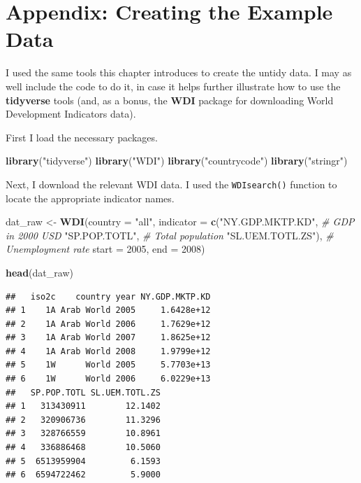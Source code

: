 \documentclass[12pt,oneside,openany]{tufte-book}
\newenvironment{Shaded}{}{}
\newcommand{\KeywordTok}[1]{\textcolor[rgb]{0.00,0.44,0.13}{\textbf{{#1}}}}
\newcommand{\DataTypeTok}[1]{\textcolor[rgb]{0.56,0.13,0.00}{{#1}}}
\newcommand{\DecValTok}[1]{\textcolor[rgb]{0.25,0.63,0.44}{{#1}}}
\newcommand{\StringTok}[1]{\textcolor[rgb]{0.25,0.44,0.63}{{#1}}}
\newcommand{\CommentTok}[1]{\textcolor[rgb]{0.38,0.63,0.69}{\textit{{#1}}}}
\newcommand{\NormalTok}[1]{{#1}}
\begin{document}
\section{Appendix: Creating the Example
Data}\label{appendix-creating-the-example-data}

I used the same tools this chapter introduces to create the untidy data.
I may as well include the code to do it, in case it helps further
illustrate how to use the \textbf{tidyverse} tools (and, as a bonus, the
\textbf{WDI} package for downloading World Development Indicators data).

First I load the necessary packages.

\begin{Shaded}
\begin{Highlighting}[]
\KeywordTok{library}\NormalTok{(}\StringTok{"tidyverse"}\NormalTok{)}
\KeywordTok{library}\NormalTok{(}\StringTok{"WDI"}\NormalTok{)}
\KeywordTok{library}\NormalTok{(}\StringTok{"countrycode"}\NormalTok{)}
\KeywordTok{library}\NormalTok{(}\StringTok{"stringr"}\NormalTok{)}
\end{Highlighting}
\end{Shaded}

Next, I download the relevant WDI data. I used the \texttt{WDIsearch()}
function to locate the appropriate indicator names.

\begin{Shaded}
\begin{Highlighting}[]
\NormalTok{dat_raw <-}\StringTok{ }\KeywordTok{WDI}\NormalTok{(}\DataTypeTok{country =} \StringTok{"all"}\NormalTok{,}
               \DataTypeTok{indicator =} \KeywordTok{c}\NormalTok{(}\StringTok{"NY.GDP.MKTP.KD"}\NormalTok{,  }\CommentTok{# GDP in 2000 USD}
                             \StringTok{"SP.POP.TOTL"}\NormalTok{,     }\CommentTok{# Total population}
                             \StringTok{"SL.UEM.TOTL.ZS"}\NormalTok{), }\CommentTok{# Unemployment rate}
               \DataTypeTok{start =} \DecValTok{2005}\NormalTok{,}
               \DataTypeTok{end =} \DecValTok{2008}\NormalTok{)}

\KeywordTok{head}\NormalTok{(dat_raw)}
\end{Highlighting}
\end{Shaded}

\begin{verbatim}
##   iso2c    country year NY.GDP.MKTP.KD
## 1    1A Arab World 2005     1.6428e+12
## 2    1A Arab World 2006     1.7629e+12
## 3    1A Arab World 2007     1.8625e+12
## 4    1A Arab World 2008     1.9799e+12
## 5    1W      World 2005     5.7703e+13
## 6    1W      World 2006     6.0229e+13
##   SP.POP.TOTL SL.UEM.TOTL.ZS
## 1   313430911        12.1402
## 2   320906736        11.3296
## 3   328766559        10.8961
## 4   336886468        10.5060
## 5  6513959904         6.1593
## 6  6594722462         5.9000
\end{verbatim}
\end{document}
